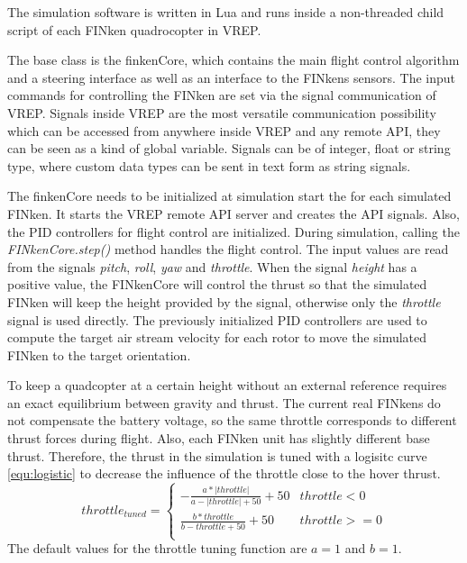 The simulation software is written in Lua and runs inside a non-threaded child script of each FINken quadrocopter in VREP.  

The base class is the finkenCore, which contains the main flight control algorithm and a steering interface as well as an interface to the FINkens sensors.
The input commands for controlling the FINken are set via the signal communication of VREP. Signals inside VREP are the most versatile communication possibility which can be accessed from anywhere inside VREP and any remote API, they can be seen as a kind of global variable. Signals can be of integer, float or string type, where custom data types can be sent in text form as string signals. 

The finkenCore needs to be initialized at simulation start the for each simulated FINken. It starts the VREP remote API server and creates the API signals. Also, the PID controllers for flight control are initialized. 
During simulation, calling the \textit{FINkenCore.step()} method handles the flight control. The input values are read from the signals \textit{pitch}, \textit{roll}, \textit{yaw} and \textit{throttle}. When the signal \textit{height} has a positive value, the FINkenCore will control the thrust so that the simulated FINken will keep the height provided by the signal, otherwise only the \textit{throttle} signal is used directly. The previously initialized PID controllers are used to compute the target air stream velocity for each rotor to move the simulated FINken to the target orientation.

To keep a quadcopter at a certain height without an external reference requires an exact equilibrium between gravity and thrust. The current real FINkens do not compensate the battery voltage, so the same throttle corresponds to different thrust forces during flight. Also, each FINken unit has slightly different base thrust. Therefore, the thrust in the simulation is tuned with a logisitc curve \ref{equ:logistic} to decrease the influence of the throttle close to the hover thrust. 
\begin{equation}
	throttle_{tuned} = \begin{cases}
		-\frac{a * |throttle|}{a - |throttle| + 50} + 50 & throttle < 0 \\
		\frac{b * throttle}{b - throttle + 50} + 50 & throttle >= 0\\
	\end{cases}
\label{equ:logistic}
\end{equation}
The default values for the throttle tuning function are  $a = 1$ and $b = 1$. 



